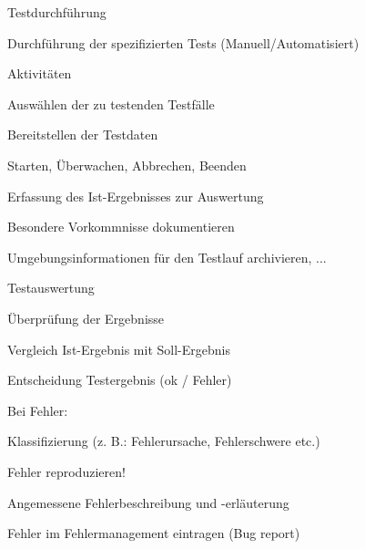 \documentclass[a4paper]{article}
\begin{document}
\begin{multicols}{3}
  Testdurchführung
  \begin{itemize*}
    \item Durchführung der spezifizierten Tests (Manuell/Automatisiert)
    \item Aktivitäten
    \begin{itemize*}
      \item Auswählen der zu testenden Testfälle
      \item Bereitstellen der Testdaten
      \item Starten, Überwachen, Abbrechen, Beenden
      \item Erfassung des Ist-Ergebnisses zur Auswertung
      \item Besondere Vorkommnisse dokumentieren
      \item Umgebungsinformationen für den Testlauf archivieren, ...
    \end{itemize*}
  \end{itemize*}

  Testauswertung
  \begin{itemize*}
    \item Überprüfung der Ergebnisse
    \item Vergleich Ist-Ergebnis mit Soll-Ergebnis
    \item Entscheidung Testergebnis (ok / Fehler)
    \item Bei Fehler:
    \begin{itemize*}
      \item Klassifizierung (z. B.: Fehlerursache, Fehlerschwere etc.)
      \item Fehler reproduzieren!
      \item Angemessene Fehlerbeschreibung und -erläuterung
      \item Fehler im Fehlermanagement eintragen (Bug report)
    \end{itemize*}
  \end{itemize*}


\end{multicols}
\end{document}
